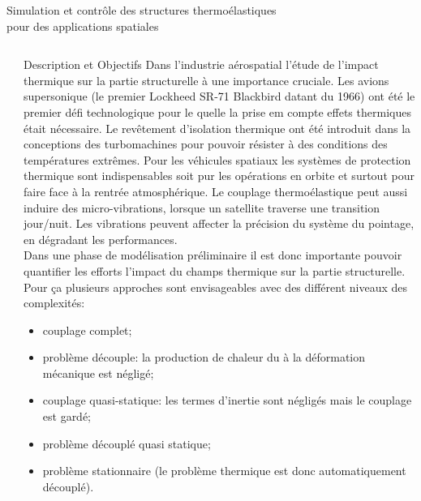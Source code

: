 \documentclass[final]{beamer}
\newlength{\sepwid}
\begin{document}
\begin{frame}[t]{\LARGE \hspace{13cm}
Simulation et contrôle des structures thermoélastiques \\ \hspace{13cm} pour des applications spatiales
}
\begin{columns}
\begin{column}{\sepwid}\end{column} %

\end{columns}

\begin{columns} 
	
	\begin{column}{\sepwid}\end{column} %
	
\begin{column}{0.95\textwidth}
\begin{block}{Description et Objectifs \vspace{1cc}}
Dans l'industrie aérospatial l'étude de l'impact thermique sur la partie structurelle à une importance cruciale. Les avions supersonique (le premier Lockheed SR-71 Blackbird datant du 1966)  ont été le premier défi technologique pour le quelle la prise em compte effets thermiques était nécessaire. Le revêtement d'isolation thermique ont été introduit dans la conceptions des turbomachines pour pouvoir résister à des conditions des températures extrêmes. Pour les véhicules spatiaux les systèmes de protection thermique sont indispensables soit pur les opérations en orbite et surtout pour faire face à la rentrée atmosphérique. Le couplage thermoélastique peut aussi induire des micro-vibrations, lorsque un satellite traverse une transition jour/nuit. Les vibrations peuvent affecter la précision du système du pointage, en dégradant les performances. \\

Dans une phase de modélisation préliminaire il est donc importante pouvoir quantifier les efforts l'impact du champs thermique sur la partie structurelle. Pour ça plusieurs approches sont envisageables avec des différent niveaux des complexités:
\begin{itemize}
	\item couplage complet;
	\item problème découple: la production de chaleur du à la déformation mécanique est négligé;
	\item couplage quasi-statique: les termes d'inertie sont négligés mais le couplage est gardé;
	\item problème découplé quasi statique;
	\item problème stationnaire (le problème thermique est donc automatiquement découplé).
\end{itemize}


\end{block}
\end{column}
\end{columns}
\end{frame}
\end{document}
